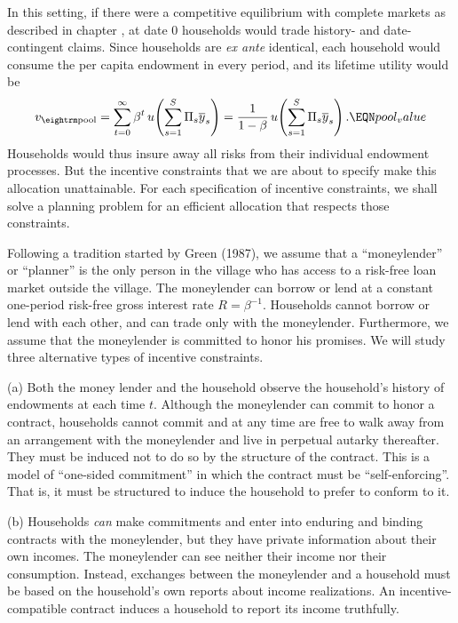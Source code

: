 In  this setting, if there were a competitive equilibrium with
complete markets as described in chapter , at date
$0$ households would trade history- and date-contingent claims. Since  households are {\it ex ante\/}
identical, each household would consume the per capita
endowment in every period, and its lifetime utility would be
$$ v_{\rm pool} = \sum_{t=0}^\infty
\beta^t \, u\!\left(\sum_{s=1}^S \Pi_s \overline y_s\right) =
 {1 \over 1-\beta}\, u\!\left(\sum_{s=1}^S \Pi_s \overline y_s\right) .
                                                        \EQN pool_value $$
 Households would thus insure away all
risks from their individual endowment processes. But the
 incentive constraints that we are about to specify make
this allocation unattainable. For each specification of incentive
constraints, we shall solve a planning problem for an efficient
allocation that respects those constraints.

   Following a tradition started by
Green (1987),
we assume that a ``moneylender'' or ``planner'' is
the only person in the  village who has access to
a risk-free loan market outside the village.
The moneylender can borrow or lend at a constant one-period
risk-free gross interest rate  $R=\beta^{-1}$.
Households cannot borrow or lend with each other,
and can  trade only with the moneylender.  Furthermore,
we assume that the moneylender is committed   to honor  his
promises.
We will study three alternative types  of incentive constraints.
\medskip
\item{  (a) } Both the money lender and the household observe   the household's  history of endowments at each  time $t$.
Although the moneylender can commit to honor a
contract, households  cannot commit and at any time are
  free to walk away from an arrangement
with the moneylender
and live in perpetual autarky thereafter.  They must be induced not to do so
by the structure of
the contract.
This is a model of ``one-sided commitment'' in which the
contract must be ``self-enforcing''.  That is, it must be structured to induce   the household to  prefer to
conform to it.
\item{ (b) } Households {\it can\/} make commitments  and enter
into enduring and   binding contracts with the moneylender,
but they have private
information about their own incomes. The moneylender
can see neither their income nor their consumption. Instead,
 exchanges between the moneylender and a household must
be based on the household's own reports about income
realizations. An incentive-compatible contract  induces
a household to report its income truthfully.

